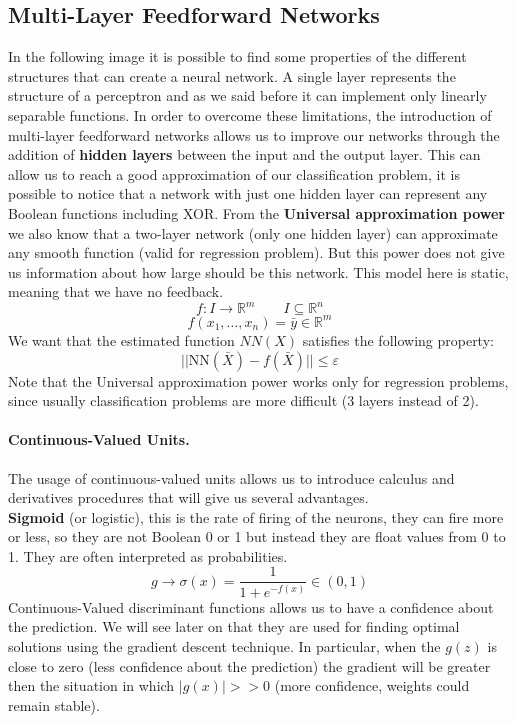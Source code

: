 \subsection{Multi-Layer Feedforward Networks}
In the following image it is possible to find some properties of the different structures that can create a neural network.
A single layer represents the structure of a perceptron and as we said before it can implement only linearly separable functions. In order to overcome these limitations, the introduction of multi-layer feedforward networks allows us to improve our networks through the addition of \textbf{hidden layers} between the input and the output layer. This can allow us to reach a good approximation of our classification problem, it is possible to notice that a network with just one hidden layer can represent any Boolean functions including XOR. From the \textbf{Universal approximation power} we also know that a two-layer network (only one hidden layer) can approximate any smooth function (valid for regression problem). But this power does not give us information about how large should be this network. This model here is static, meaning that we have no feedback.
$$f: I \rightarrow \mathbb{ R }^m \qquad I \subseteq \mathbb{ R }^n$$
$$f(x_1,\dots,x_n) = \bar{y}\in \mathbb{ R }^m$$
We want that the estimated function $NN(X)$ satisfies the following property:
$$||\text{NN}(\bar X)- f(\bar X)|| \leq \varepsilon$$
		
Note that the Universal approximation power works only for regression problems, since usually classification problems are more difficult (3 layers instead of 2).

\paragraph*{Continuous-Valued Units.} The usage of continuous-valued units allows us to introduce calculus and derivatives procedures that will give us several advantages.\\ 
\textbf{Sigmoid} (or logistic), this is the rate of firing of the neurons, they can fire more or less, so they are not Boolean 0 or 1 but instead they are float values from 0 to 1. They are often interpreted as probabilities.
$$g \rightarrow \sigma(x) = \frac{1}{1+e^{-f(x)}} \in (0,1)$$
Continuous-Valued discriminant functions allows us to have a confidence about the prediction. We will see later on that they are used for finding optimal solutions using the gradient descent technique. In particular, when the $g(z)$ is close to zero (less confidence about the prediction) the gradient will be greater then the situation in which $|g(x)| >> 0$ (more confidence, weights could remain stable).\\

